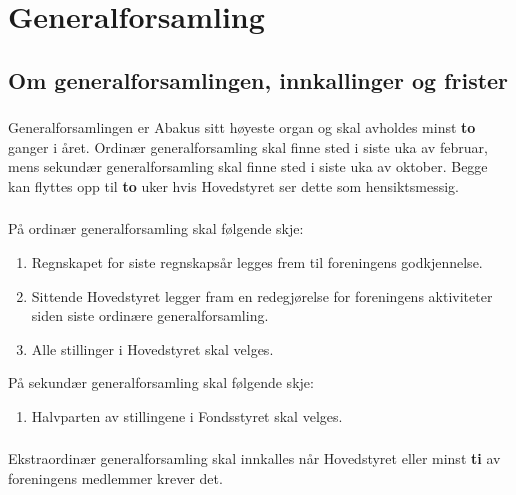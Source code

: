 \section{Generalforsamling}
\subsection{Om generalforsamlingen, innkallinger og frister}
\subsubsection{}
Generalforsamlingen er Abakus sitt høyeste organ og skal avholdes minst \textbf{to} ganger i året. 
Ordinær generalforsamling skal finne sted i siste uka av februar, mens sekundær generalforsamling 
skal finne sted i siste uka av oktober. Begge kan flyttes opp til \textbf{to} uker hvis Hovedstyret ser dette som hensiktsmessig.

\subsubsection{}
På ordinær generalforsamling skal følgende skje: 
\begin{enumerate}[label=\alph*)]
    \item Regnskapet for siste regnskapsår legges frem til foreningens godkjennelse.
    \item Sittende Hovedstyret legger fram en redegjørelse for foreningens aktiviteter siden siste ordinære generalforsamling.
    \item Alle stillinger i Hovedstyret skal velges.
\end{enumerate}

På sekundær generalforsamling skal følgende skje:
\begin{enumerate}[label=\alph*)]
    \item Halvparten av stillingene i Fondsstyret skal velges.
\end{enumerate}

\subsubsection{}
Ekstraordinær generalforsamling skal innkalles når Hovedstyret eller minst
\textbf{ti} av foreningens medlemmer krever det.

